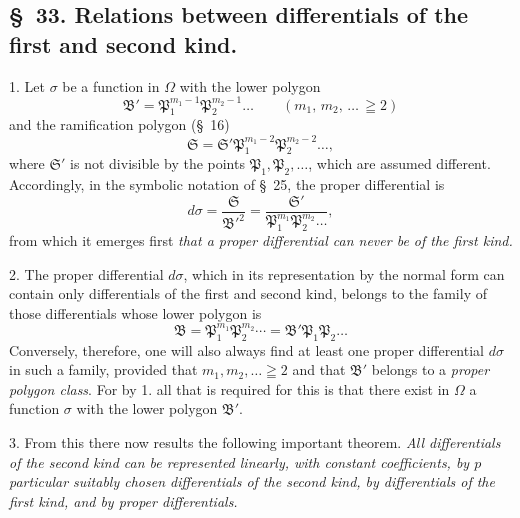 \documentclass{article}
\begin{document}
\subsection*{§~33. Relations between differentials of the first and second kind.}

1. Let $\sigma$ be a function in $\Omega$ with the lower polygon
\[ \mathfrak{B}' = \mathfrak{P}_{1}^{m_{1}-1}\mathfrak{P}_{2}^{m_{2}-1}\ldots \qquad {\scriptstyle (m_{1},\, m_{2},\, \ldots\, \geqq 2)} \]
and the ramification polygon (§~16)
\[ \mathfrak{S} = \mathfrak{S}'\mathfrak{P}_{1}^{m_{1}-2}\mathfrak{P}_{2}^{m_{2}-2}\ldots, \]
where $\mathfrak{S}'$ is not divisible by the points $\mathfrak{P}_{1}, \mathfrak{P}_{2}, \ldots$, which are assumed different. Accordingly, in the symbolic notation of §~25, the proper differential is
\[ d\sigma = \frac{\mathfrak{S}}{\mathfrak{B}'^{2}} = \frac{\mathfrak{S}'}{\mathfrak{P}_{1}^{m_{1}}\mathfrak{P}_{2}^{m_{2}}\ldots}, \]
from which it emerges first \emph{that a proper differential can never be of the first kind.}


2. The proper differential $d\sigma$, which in its representation by the normal form can contain only differentials of the first and second kind, belongs to the family of those differentials whose lower polygon is
\[ \mathfrak{B} = \mathfrak{P}_{1}^{m_{1}}\mathfrak{P}_{2}^{m_{2}}\cdots = \mathfrak{B}'\mathfrak{P}_{1}\mathfrak{P}_{2}\ldots \]
Conversely, therefore, one will also always find at least one proper differential $d\sigma$ in such a family, provided that $m_{1}, m_{2}, \ldots \geqq 2$ and that $\mathfrak{B}'$ belongs to a \emph{proper polygon class}. For by 1. all that is required for this is that there exist in $\Omega$ a function $\sigma$ with the lower polygon $\mathfrak{B}'$.

3. From this there now results the following important theorem. \emph{All differentials of the second kind can be represented linearly, with constant coefficients, by $p$ particular suitably chosen differentials of the second kind, by differentials of the first kind, and by proper differentials.}
\end{document}
